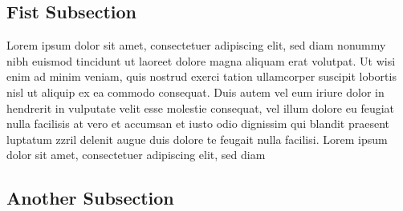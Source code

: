 \subsection{Fist Subsection}

Lorem ipsum dolor sit amet, consectetuer adipiscing elit, sed diam nonummy nibh euismod tincidunt ut laoreet dolore magna aliquam erat volutpat. Ut wisi enim ad minim veniam, quis nostrud exerci tation ullamcorper suscipit lobortis nisl ut aliquip ex ea commodo consequat. Duis autem vel eum iriure dolor in hendrerit in vulputate velit esse molestie consequat, vel illum dolore eu feugiat nulla facilisis at vero et accumsan et iusto odio dignissim qui blandit praesent luptatum zzril delenit augue duis dolore te feugait nulla facilisi. Lorem ipsum dolor sit amet, consectetuer adipiscing elit, sed diam 

\subsection{Another Subsection}

